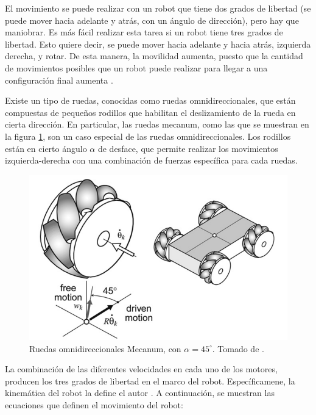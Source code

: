 El movimiento se puede realizar con un robot que tiene dos grados de libertad (se puede mover hacia adelante y atrás, con un ángulo de dirección), pero hay que maniobrar. Es más fácil realizar esta tarea si un robot tiene tres grados de libertad. Esto quiere decir, se puede mover hacia adelante y hacia atrás, izquierda derecha, y rotar. De esta manera, la movilidad aumenta, puesto que la cantidad de movimientos posibles que un robot puede realizar para llegar a una configuración final aumenta \cite{Batlle2009}.

Existe un tipo de ruedas, conocidas como ruedas omnidireccionales, que están compuestas de pequeños rodillos que habilitan el deslizamiento de la rueda en cierta dirección. En particular, las ruedas mecanum, como las que se muestran en la figura \ref{F:ruedas_mecanum}, son un caso especial de las ruedas omnidireccionales. Los rodillos están en cierto ángulo $\alpha$ de desface, que permite realizar los movimientos izquierda-derecha con una combinación de fuerzas específica para cada ruedas.

\begin{figure}[H]
  \centering
  \includegraphics[scale=0.3]{imagenes/ruedas_mecanum.png}
  \caption{Ruedas omnidireccionales Mecanum, con $\alpha = 45^\circ $. Tomado de \cite{Batlle2009}.}
  \label{F:ruedas_mecanum}
\end{figure}

La combinación de las diferentes velocidades en cada uno de los motores, producen los tres grados de libertad en el marco del robot. Específicamene, la kinemática del robot la define el autor \cite{Taheri2015}. A continuación, se muestran las ecuaciones que definen el movimiento del robot:

